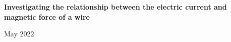 \documentclass[12pt]{article}
\begin{document}
	\begin{center}
		\textbf{\large Investigating the relationship between the electric current and magnetic force of a wire}

		\vspace*{12pt}

		May 2022
	\end{center}

    
\end{document}

